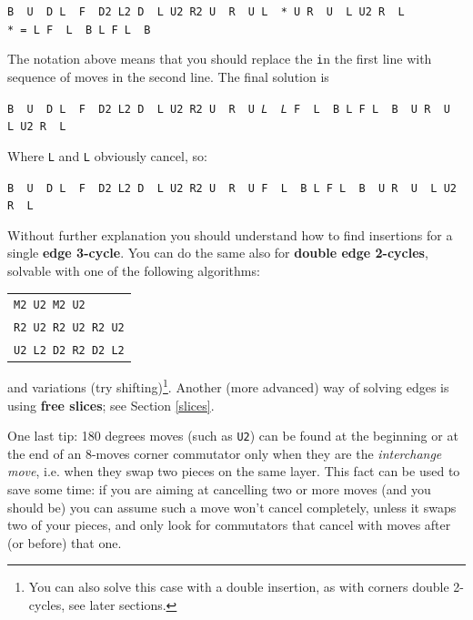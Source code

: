 \documentclass[11pt,a4paper]{book}
\newcommand{\p}{\textquotesingle}
\newcommand{\m}{\texttt}
\newcommand{\ps}{\p\,\,}
\begin{document}
\begin{center}
\m{B\ps U\ps D L\ps F\ps D2 L2 D\ps L U2 R2 U\ps R\ps U L\ps * U R\ps U\ps L U2 R\ps L\p}\\
\m{* = L F\ps L\ps B L F L\ps B\p}
\end{center}

The notation above means that you should replace the \m * in the first line with sequence of moves in the second line. The final solution is

\begin{center}
\m{B\ps U\ps D L\ps F\ps D2 L2 D\ps L U2 R2 U\ps R\ps U \emph{L\ps L} F\ps L\ps B L F L\ps B\ps U R\ps U\ps L U2 R\ps L\p}
\end{center}

Where \m L and \m{L\p} obviously cancel, so:

\begin{center}
\m{B\ps U\ps D L\ps F\ps D2 L2 D\ps L U2 R2 U\ps R\ps U F\ps L\ps B L F L\ps B\ps U R\ps U\ps L U2 R\ps L\p}
\end{center}

Without further explanation you should understand how to find insertions for a single \textbf{edge 3-cycle}. You can do the same also for \textbf{double edge 2-cycles}, solvable with one of the following algorithms:

\begin{center}
\begin{tabular}{l}
\m{M2 U2 M2 U2}\\
\m{R2 U2 R2 U2 R2 U2}\\
\m{U2 L2 D2 R2 D2 L2}
\end{tabular}
\end{center}

and variations (try shifting)\footnote{You can also solve this case with a double insertion, as with corners double 2-cycles, see later sections.}. Another (more advanced) way of solving edges is using \textbf{free slices}; see Section \ref{slices}.

One last tip: 180 degrees moves (such as \m{U2}) can be found at the beginning or at the end of an 8-moves corner commutator only when they are the \emph{interchange move}, i.e. when they swap two pieces on the same layer. This fact can be used to save some time: if you are aiming at cancelling two or more moves (and you should be) you can assume such a move won't cancel completely, unless it swaps two of your pieces, and only look for commutators that cancel with moves after (or before) that one.
\end{document}
